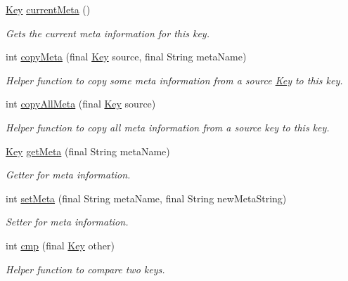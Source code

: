 \begin{DoxyCompactItemize}
\hyperlink{classorg_1_1libelektra_1_1Key}{Key} \hyperlink{classorg_1_1libelektra_1_1Key_af6a740822cebbda1e500093c4d69c5f8}{current\+Meta} ()
\begin{DoxyCompactList}\small\item\em Gets the current meta information for this key. \end{DoxyCompactList}\item 
int \hyperlink{classorg_1_1libelektra_1_1Key_a421a4240ce01f2f196bdce7b3c1d02c2}{copy\+Meta} (final \hyperlink{classorg_1_1libelektra_1_1Key}{Key} source, final String meta\+Name)
\begin{DoxyCompactList}\small\item\em Helper function to copy some meta information from a source \hyperlink{classorg_1_1libelektra_1_1Key}{Key} to this key. \end{DoxyCompactList}\item 
int \hyperlink{classorg_1_1libelektra_1_1Key_a9483ae832c9c16e4d68ed1c26babe2ce}{copy\+All\+Meta} (final \hyperlink{classorg_1_1libelektra_1_1Key}{Key} source)
\begin{DoxyCompactList}\small\item\em Helper function to copy all meta information from a source key to this key. \end{DoxyCompactList}\item 
\hyperlink{classorg_1_1libelektra_1_1Key}{Key} \hyperlink{classorg_1_1libelektra_1_1Key_a49d5d04f67917075c7b1513249777ccf}{get\+Meta} (final String meta\+Name)
\begin{DoxyCompactList}\small\item\em Getter for meta information. \end{DoxyCompactList}\item 
int \hyperlink{classorg_1_1libelektra_1_1Key_ac8c73ca3d16cf4454bd326ebe469cf2d}{set\+Meta} (final String meta\+Name, final String new\+Meta\+String)
\begin{DoxyCompactList}\small\item\em Setter for meta information. \end{DoxyCompactList}\item 
int \hyperlink{classorg_1_1libelektra_1_1Key_aa5271913871c1ee2f31f32190a7e14aa}{cmp} (final \hyperlink{classorg_1_1libelektra_1_1Key}{Key} other)
\begin{DoxyCompactList}\small\item\em Helper function to compare two keys. \end{DoxyCompactList}\item 

\end{DoxyCompactItemize}

